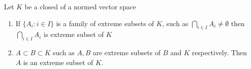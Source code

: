\documentclass[12pt]{article}
\begin{document}
Let $K$ be a closed  of a normed vector space
\begin{enumerate}
\item If $\{A_i\colon i\in I\}$ is a family of extreme subsets of $K$, such as $\bigcap_{i\in I}A_i\neq \emptyset$
then  $\bigcap_{i\in I}A_i$ is extreme subset of $K$
\item $A\subset B\subset K$ such as $A,B$ are extreme subsets of $B$ and $K$ respectively. Then $A$ is an extreme subset of $K$.
\end{enumerate}
\end{document}
